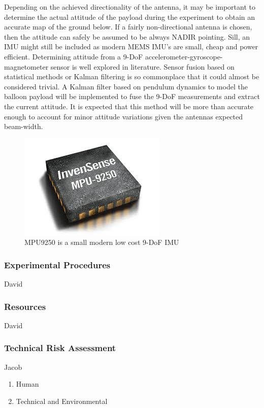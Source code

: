 \documentclass[12pt]{article}
\begin{document}
Depending on the achieved directionality of the antenna, it may be important to determine the actual attitude of the payload during the experiment to obtain an accurate map of the ground below. If a fairly non-directional antenna is chosen, then the attitude can safely be assumed to be always NADIR pointing. Sill, an IMU might still be included as modern MEMS IMU's are small, cheap and power efficient. Determining attitude from a 9-DoF accelerometer-gyroscope-magnetometer sensor is well explored in literature. Sensor fusion based on statistical methods or Kalman filtering is so commonplace that it could almost be considered trivial. A Kalman filter based on pendulum dynamics to model the balloon payload will be implemented to fuse the 9-DoF measurements and extract the current attitude. It is expected that this method will be more than accurate enough to account for minor attitude variations given the antennas expected beam-width. \cite{Vujicic2016} \cite{Estimation2017} \cite{Rhudy2017} \cite{Chow} \cite{Wan}

\begin{figure}[h!]
	\centering
	\includegraphics[width=.4\linewidth]{Figures/IMU.jpg}
	\caption{MPU9250 is a small modern low cost 9-DoF IMU}
	\label{fig:imu}
\end{figure}

\subsubsection{Experimental Procedures}
David
\subsubsection{Resources}
David
\subsubsection{Technical Risk Assessment}
Jacob
\begin{enumerate}
\item Human
\item Technical and Environmental
\end{enumerate}
\end{document}
